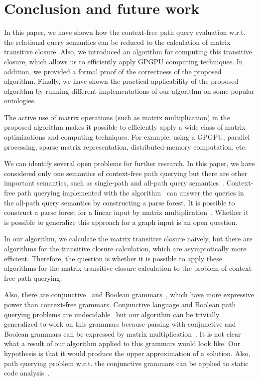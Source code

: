 \section{Conclusion and future work}
In this paper, we have shown how the context-free path query evaluation w.r.t. the relational query semantics can be reduced to the calculation of matrix transitive closure. Also, we introduced an algorithm for computing this transitive closure, which allows us to efficiently apply GPGPU computing techniques. In addition, we provided a formal proof of the correctness of the proposed algorithm. Finally, we have shown the practical applicability of the proposed algorithm by running different implementations of our algorithm on some popular ontologies.

The active use of matrix operations (such as matrix multiplication) in the proposed algorithm makes it possible to efficiently apply a wide class of matrix optimizations and computing techniques. For example, using a GPGPU, parallel processing, sparse matrix representation, distributed-memory computation, etc.

We can identify several open problems for further research. In this paper, we have considered only one semantics of context-free path querying but there are other important semantics, such as single-path and all-path query semantics~\cite{hellingsPathQuerying}. Context-free path querying implemented with the algorithm~\cite{GLL} can answer the queries in the all-path query semantics by constructing a parse forest. It is possible to construct a parse forest for a linear input by matrix multiplication~\cite{okhotin_cyk}. Whether it is possible to generalize this approach for a graph input is an open question.

In our algorithm, we calculate the matrix transitive closure naively, but there are algorithms for the transitive closure calculation, which are asymptotically more efficient. Therefore, the question is whether it is possible to apply these algorithms for the matrix transitive closure calculation to the problem of context-free path querying.

Also, there are conjunctive~\cite{okhotinConjAndBool} and Boolean grammars~\cite{okhotinBoolean}, which have more expressive power than context-free grammars. Conjunctive language and Boolean path querying problems are undecidable~\cite{hellingsRelational} but our algorithm can be trivially generalized to work on this grammars because parsing with conjunctive and Boolean grammars can be expressed by matrix multiplication~\cite{okhotin_cyk}. It is not clear what a result of our algorithm applied to this grammars would look like. Our hypothesis is that it would produce the upper approximation of a solution. Also, path querying problem w.r.t. the conjunctive grammars can be applied to static code analysis~\cite{zhang2017context}.
